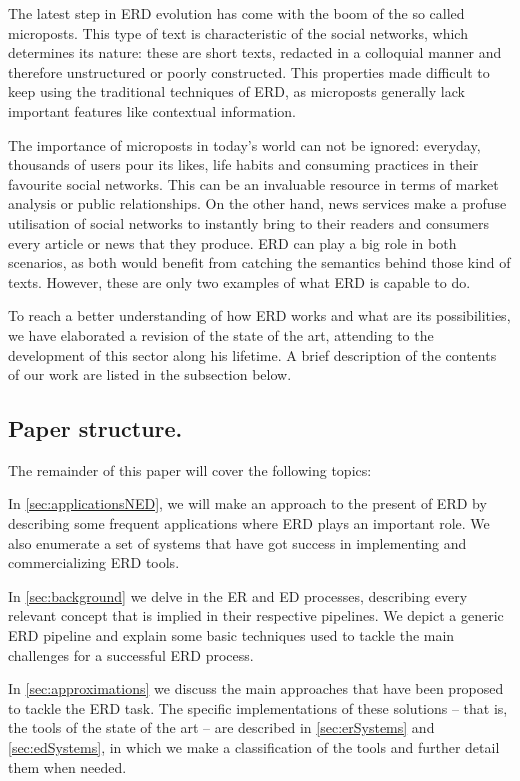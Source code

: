 The latest step in ERD evolution has come with the boom of the so called microposts. This type of text is characteristic of the social networks, which determines its nature: these are short texts, redacted in a colloquial manner and therefore unstructured or poorly constructed. This properties made difficult to keep using the traditional techniques of ERD, as microposts generally lack important features like contextual information.

The importance of microposts in today's world can not be ignored: everyday, thousands of users pour its likes, life habits and consuming practices in their favourite social networks. This can be an invaluable resource in terms of market analysis or public relationships. On the other hand, news services make a profuse utilisation of social networks to instantly bring to their readers and consumers every article or news that they produce. ERD can play a big role in both scenarios, as both would benefit from catching the semantics behind those kind of texts. However, these are only two examples of what ERD is capable to do.

To reach a better understanding of how ERD works and what are its possibilities, we have elaborated a revision of the state of the art, attending to the development of this sector along his lifetime. A brief description of the contents of our work are listed in the subsection below.



\subsection{Paper structure.}

The remainder of this paper will cover the following topics:

In \autoref{sec:applicationsNED}, we will make an approach to the present of ERD by describing some frequent applications where ERD plays an important role. We also enumerate a set of systems that have got success in implementing and commercializing ERD tools.

In \autoref{sec:background} we delve in the ER and ED processes, describing every relevant concept that is implied in their respective pipelines. We depict a generic ERD pipeline and explain some basic techniques used to tackle the main challenges for a successful ERD process.

In \autoref{sec:approximations} we discuss the main approaches that have been proposed to tackle the ERD task. The specific implementations of these solutions -- that is, the tools of the state of the art -- are described in \autoref{sec:erSystems} and \autoref{sec:edSystems}, in which we make a classification of the tools and further detail them when needed.

